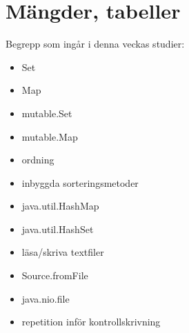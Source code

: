 \chapter{Mängder, tabeller}\label{chapter:W07}
Begrepp som ingår i denna veckas studier:
\begin{itemize}[noitemsep,label={$\square$},leftmargin=*]
\item Set
\item Map
\item mutable.Set
\item mutable.Map
\item ordning
\item inbyggda sorteringsmetoder
\item java.util.HashMap
\item java.util.HashSet
\item läsa/skriva textfiler
\item Source.fromFile
\item java.nio.file
\item repetition inför kontrollskrivning\end{itemize}
